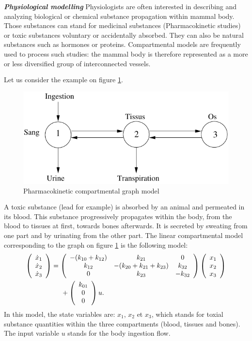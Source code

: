 \begin{exemple}{\bf \em Physiological modelling}
Physiologists are often interested in describing and analyzing biological or chemical substance propagation within mammal body.
Those substances can stand for medicinal substances (Pharmacokinetic studies) or toxic substances voluntary or accidentally absorbed.
They can also be natural substances such as hormones or proteins.
Compartmental models are frequently used to process such studies: 
the mammal body is therefore represented as a more or less diversified group of interconnected vessels.

Let us consider the example on figure \ref{Fig:grapharmaco}.
\begin{figure}[ht] 
\begin{center}
\includegraphics{images/grapharmaco}
\caption{Pharmacokinetic compartmental graph model}
\label{Fig:grapharmaco}
\end{center} 
\end{figure}

A toxic substance (lead for example) is absorbed by an animal and permeated in its blood.
This substance progressively propagates within the body, from the blood to tissues at first, towards bones afterwards.
It is secreted by sweating from one part and by urinating from the other part.
The linear compartmental model corresponding to the graph on figure \ref{Fig:grapharmaco} is the following model:
\begin{equation*} \begin{split}
\bma{c} \dot x_1 \\ \dot x_2 \\ \dot x_3 \ema &= 
\bma{ccc} -(k_{10} + k_{12}) & k_{21} & 0 \\ 
k_{12} & -(k_{20} + k_{21} + k_{23}) & k_{32} \\ 0 & k_{23} & - k_{32} \ema
\bma{c} x_1 \\ x_2 \\ x_3 \ema \\
& \hd + \bma{c} k_{ 01}\\ 0 \\ 0 \ema u.
\end{split} \end{equation*}
In this model, the state variables are: $x_1$, $x_2$ et $x_3$, which stands for toxial substance quantities within the three compartments (blood, tissues and bones).
The input variable $u$ stands for the body ingestion flow.
\cqfd
\end{exemple}


